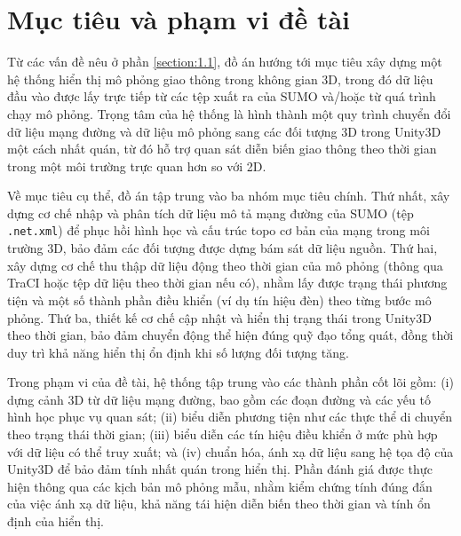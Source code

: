 \documentclass[../DoAn.tex]{subfiles}
\begin{document}
\section{Mục tiêu và phạm vi đề tài}
\label{section:1.2}



Từ các vấn đề nêu ở phần \ref{section:1.1}, đồ án hướng tới mục tiêu xây dựng một hệ thống hiển thị mô phỏng giao thông trong không gian 3D, trong đó dữ liệu đầu vào được lấy trực tiếp từ các tệp xuất ra của SUMO và/hoặc từ quá trình chạy mô phỏng. Trọng tâm của hệ thống là hình thành một quy trình chuyển đổi dữ liệu mạng đường và dữ liệu mô phỏng sang các đối tượng 3D trong Unity3D một cách nhất quán, từ đó hỗ trợ quan sát diễn biến giao thông theo thời gian trong một môi trường trực quan hơn so với 2D.

Về mục tiêu cụ thể, đồ án tập trung vào ba nhóm mục tiêu chính. Thứ nhất, xây dựng cơ chế nhập và phân tích dữ liệu mô tả mạng đường của SUMO (tệp \texttt{.net.xml}) để phục hồi hình học và cấu trúc topo cơ bản của mạng trong môi trường 3D, bảo đảm các đối tượng được dựng bám sát dữ liệu nguồn. Thứ hai, xây dựng cơ chế thu thập dữ liệu động theo thời gian của mô phỏng (thông qua TraCI hoặc tệp dữ liệu theo thời gian nếu có), nhằm lấy được trạng thái phương tiện và một số thành phần điều khiển (ví dụ tín hiệu đèn) theo từng bước mô phỏng. Thứ ba, thiết kế cơ chế cập nhật và hiển thị trạng thái trong Unity3D theo thời gian, bảo đảm chuyển động thể hiện đúng quỹ đạo tổng quát, đồng thời duy trì khả năng hiển thị ổn định khi số lượng đối tượng tăng.

Trong phạm vi của đề tài, hệ thống tập trung vào các thành phần cốt lõi gồm: (i) dựng cảnh 3D từ dữ liệu mạng đường, bao gồm các đoạn đường và các yếu tố hình học phục vụ quan sát; (ii) biểu diễn phương tiện như các thực thể di chuyển theo trạng thái thời gian; (iii) biểu diễn các tín hiệu điều khiển ở mức phù hợp với dữ liệu có thể truy xuất; và (iv) chuẩn hóa, ánh xạ dữ liệu sang hệ tọa độ của Unity3D để bảo đảm tính nhất quán trong hiển thị. Phần đánh giá được thực hiện thông qua các kịch bản mô phỏng mẫu, nhằm kiểm chứng tính đúng đắn của việc ánh xạ dữ liệu, khả năng tái hiện diễn biến theo thời gian và tính ổn định của hiển thị.
\end{document}
